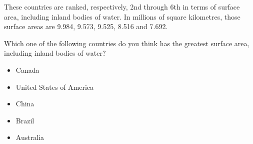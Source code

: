
These countries are ranked, respectively, 2nd through 6th in terms of surface area, including inland bodies of water.
In millions of square kilometres, those surface areas are 9.984, 9.573, 9.525, 8.516 and 7.692.

\begin{tcolorbox}
Which one of the following countries do you think has the greatest surface area, including inland bodies of water?
	
\begin{itemize}
	\setlength\itemsep{-5pt}
	\item Canada
	\item United States of America
	\item China
	\item Brazil
	\item Australia
\end{itemize}
\end{tcolorbox}
